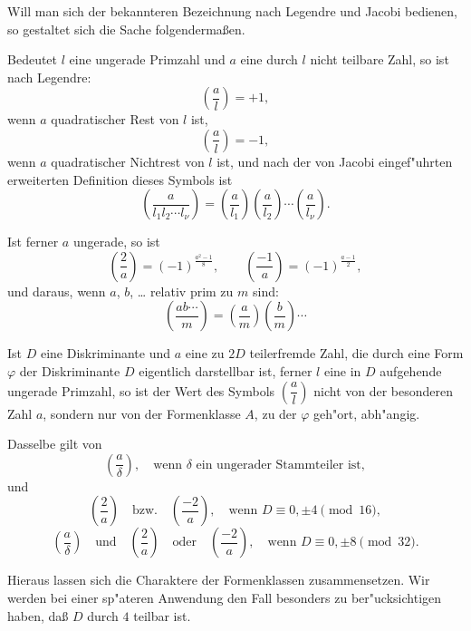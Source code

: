 \documentclass[11pt,a4paper]{article}
\theoremstyle{plain}
\begin{document}
\bigskip

Will man sich der bekannteren Bezeichnung nach Legendre und Jacobi bedienen, so gestaltet sich die Sache folgenderma\ss{}en.

Bedeutet $l$ eine ungerade Primzahl und $a$ eine durch $l$ nicht teilbare Zahl, so ist nach Legendre:
\begin{equation}
\label{eq:105_1}
\left(\frac{a}{l}\right) = +1,
\end{equation}
wenn $a$ quadratischer Rest von $l$ ist,
\[
\left(\frac{a}{l}\right) = -1,
\]
wenn $a$ quadratischer Nichtrest von $l$ ist, und nach der von Jacobi eingef"{u}hrten erweiterten Definition dieses Symbols ist
\[
\left(\frac{a}{l_1l_2\cdots l_\nu}\right) = \left(\frac{a}{l_1}\right)\left(\frac{a}{l_2}\right)\cdots\left(\frac{a}{l_\nu}\right).
\]

\newpage
\setcounter{page}{386}

Ist ferner $a$ ungerade, so ist
\[
\left(\frac{2}{a}\right) = (-1)^{\frac{a^2-1}{8}}, \qquad \left(\frac{-1}{a}\right) = (-1)^{\frac{a-1}{2}},
\]
und daraus, wenn $a$, $b$, \dots{} relativ prim zu $m$ sind:
\[
\left(\frac{ab\cdots}{m}\right) = \left(\frac{a}{m}\right)\left(\frac{b}{m}\right)\cdots
\]

Ist $D$ eine Diskriminante und $a$ eine zu $2D$ teilerfremde Zahl, die durch eine Form $\varphi$ der Diskriminante $D$ eigentlich darstellbar ist, ferner $l$ eine in $D$ aufgehende ungerade Primzahl, so ist der Wert des Symbols $\left(\dfrac{a}{l}\right)$ nicht von der besonderen Zahl $a$, sondern nur von der Formenklasse $A$, zu der $\varphi$ geh"{o}rt, abh"{a}ngig.

Dasselbe gilt von
\begin{equation}
\label{eq:105_2}
\left(\frac{a}{\delta}\right), \quad \text{wenn } \delta \text{ ein ungerader Stammteiler ist},
\end{equation}
und
\begin{equation}
\label{eq:105_3}
\left(\frac{2}{a}\right) \quad \text{bzw.} \quad \left(\frac{-2}{a}\right), \quad \text{wenn } D \equiv 0, \pm 4 \pmod{16},
\end{equation}
\begin{equation}
\label{eq:105_4}
\left(\frac{a}{\delta}\right) \quad \text{und} \quad \left(\frac{2}{a}\right) \quad \text{oder} \quad \left(\frac{-2}{a}\right), \quad \text{wenn } D \equiv 0, \pm 8 \pmod{32}.
\end{equation}

Hieraus lassen sich die Charaktere der Formenklassen zusammensetzen. Wir werden bei einer sp"{a}teren Anwendung den Fall besonders zu ber"{u}cksichtigen haben, da\ss{} $D$ durch $4$ teilbar ist.
\end{document}
